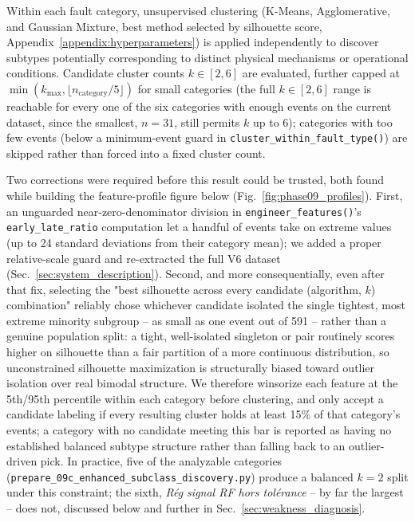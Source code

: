 Within each fault category, unsupervised clustering (K-Means, Agglomerative, and Gaussian Mixture, best method selected by silhouette score, Appendix~\ref{appendix:hyperparameters}) is applied independently to discover subtypes potentially corresponding to distinct physical mechanisms or operational conditions. Candidate cluster counts $k \in [2, 6]$ %
are evaluated, further capped at $\min(k_{\max}, \lfloor n_{\mathrm{category}}/5 \rfloor)$ for small categories (the full $k\in[2,6]$ range is reachable for every one of the six categories with enough events on the current dataset, since the smallest, $n=31$, still permits $k$ up to 6); categories with too few events (below a minimum-event guard in \texttt{cluster\_within\_fault\_type()}) are skipped rather than forced into a fixed cluster count. %

Two corrections were required before this result could be trusted, both found while building the feature-profile figure below (Fig.~\ref{fig:phase09_profiles}). First, an unguarded near-zero-denominator division in \texttt{engineer\_features()}'s \texttt{early\_late\_ratio} computation let a handful of events take on extreme values (up to 24 standard deviations from their category mean); we added a proper relative-scale guard and re-extracted the full V6 dataset (Sec.~\ref{sec:system_description}). Second, and more consequentially, even after that fix, selecting the "best silhouette across every candidate (algorithm, $k$) combination" reliably chose whichever candidate isolated the single tightest, most extreme minority subgroup -- as small as one event out of 591 -- rather than a genuine population split: a tight, well-isolated singleton or pair routinely scores higher on silhouette than a fair partition of a more continuous distribution, so unconstrained silhouette maximization is structurally biased toward outlier isolation over real bimodal structure. We therefore winsorize each feature at the 5th/95th percentile within each category before clustering, and only accept a candidate labeling if every resulting cluster holds at least 15\% of that category's events; a category with no candidate meeting this bar is reported as having no established balanced subtype structure rather than falling back to an outlier-driven pick. In practice, five of the \MetricZeroNinecEnhancedSubclassDiscoveryNCategoriesAnalyzed{} analyzable categories (\texttt{prepare\_09c\_enhanced\_subclass\_discovery.py}) produce a balanced $k=2$ split under this constraint; the sixth, \textit{Rég signal RF hors tolérance} -- by far the largest -- does not, discussed below and further in Sec.~\ref{sec:weakness_diagnosis}. %

